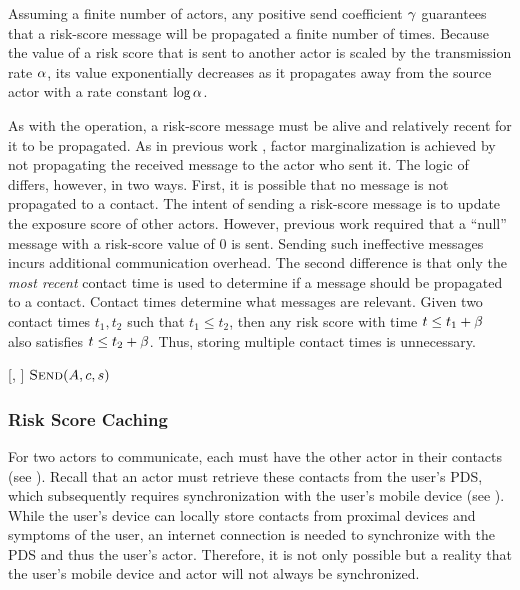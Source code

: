Assuming a finite number of actors, any positive send coefficient $\gamma$ guarantees that a risk-score message will be propagated a finite number of times. Because the value of a risk score that is sent to another actor is scaled by the transmission rate $\alpha$, its value exponentially decreases as it propagates away from the source actor with a rate constant $\log \alpha$.

As with the \cSendCurrentOrCached[] operation, a risk-score message must be alive and relatively recent for it to be propagated. As in previous work \cite{Ayday2021}, factor marginalization is achieved by not propagating the received message to the actor who sent it. The logic of \cPropagate[] differs, however, in two ways. First, it is possible that no message is not propagated to a contact. The intent of sending a risk-score message is to update the exposure score of other actors. However, previous work \cite{Ayday2021} required that a ``null'' message with a risk-score value of 0 is sent. Sending such ineffective messages incurs additional communication overhead. The second difference is that only the \emph{most recent} contact time is used to determine if a message should be propagated to a contact. Contact times determine what messages are relevant. Given two contact times $t_1, t_2$ such that $t_1 \leq t_2$, then any risk score with time $t \leq t_1 + \beta$ also satisfies $t \leq t_2 + \beta$. Thus, storing multiple contact times is unnecessary.
%
\begin{function}{\nPropagate}[\vActor, \vScore]
    \ForEach{$\vContact \in \aActorContacts$}
    	\If{$\cShouldReceive[\vContact, \vScore]$}
    		\State $\cSend[\vActor, \vContact, \vScore]$
    	\EndIf
    \EndFor
\end{function}

\subsubsection{Risk Score Caching}\label{sec:caching}

For two actors to communicate, each must have the other actor in their contacts (see ). Recall that an actor must retrieve these contacts from the user's PDS, which subsequently requires synchronization with the user's mobile device (see ). While the user's device can locally store contacts from proximal devices and symptoms of the user, an internet connection is needed to synchronize with the PDS and thus the user's actor. Therefore, it is not only possible but a reality that the user's mobile device and actor will not always be synchronized.

